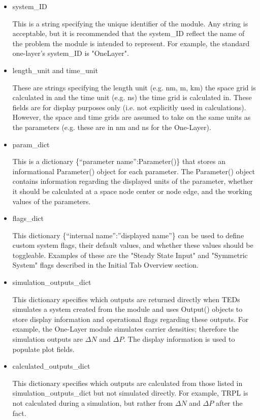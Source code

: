 \documentclass[11pt,letterpaper,titlepage]{article}
\begin{document}
		\begin{itemize}
			\item system\_ID
			\par This is a string specifying the unique identifier of the module. Any string is acceptable, but it is recommended that the system\_ID reflect the name of the problem the module is intended to represent. For example, the standard one-layer's system\_ID is "OneLayer".
			
			\item length\_unit and time\_unit
			\par These are strings specifying the length unit (e.g. nm, m, km) the space grid is calculated in and the time unit (e.g. ns) the time grid is calculated in. These fields are for display purposes only (i.e. not explicitly used in calculations). However, the space and time grids are assumed to take on the same units as the parameters (e.g. these are in nm and ns for the One-Layer).
			
			\item param\_dict
			\par This is a dictionary \{“parameter name”:Parameter()\} that stores an informational Parameter() object for each parameter. The Parameter() object contains information regarding the displayed units of the parameter, whether it should be calculated at a space node center or node edge, and the working values of the parameters.
			
			\item flags\_dict
			\par This dictionary  \{“internal name”:”displayed name”\} can be used to define custom system flags, their default values, and whether these values should be toggleable. Examples of these are the "Steady State Input" and "Symmetric System" flags described in the Initial Tab Overview section.
			
			\item simulation\_outputs\_dict
			\par This dictionary specifies which outputs are returned directly when TEDs simulates a system created from the module and uses Output() objects to store display information and operational flags regarding these outputs. For example, the One-Layer module simulates carrier densities; therefore the simulation outputs are $\Delta N$ and $\Delta P$. The display information is used to populate plot fields.
			
			\item calculated\_outputs\_dict
			\par This dictionary specifies which outputs are calculated from those listed in simulation\_outputs\_dict but not simulated directly. For example, TRPL is not calculated during a simulation, but rather from $\Delta N$ and $\Delta P$ after the fact.
			

\end{itemize}
\end{document}
